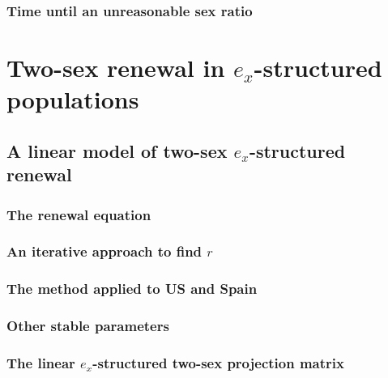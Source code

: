       \subsection{Time until an unreasonable sex ratio}
        
        
\chapter{Two-sex renewal in $e_x$-structured populations}
  
  
  \section{A linear model of two-sex $e_x$-structured renewal}
    
    
    \subsection{The renewal equation}
      
      
    \subsection{An iterative approach to find $r$}
        
    
    \subsection{The method applied to US and Spain}
        
        
    \subsection{Other stable parameters}
        
    
    \subsection{The linear $e_x$-structured two-sex projection matrix}
      
    
